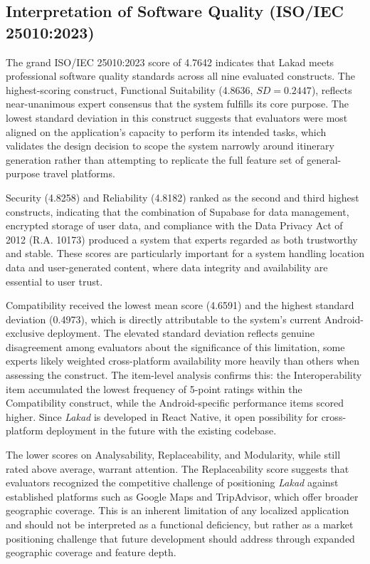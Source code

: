 \subsection{Interpretation of Software Quality (ISO/IEC 25010:2023)}
 
The grand ISO/IEC 25010:2023 score of 4.7642 indicates that Lakad meets
professional software quality standards across all nine evaluated
constructs. The highest-scoring construct, Functional Suitability
(4.8636, $SD = 0.2447$), reflects near-unanimous expert consensus that
the system fulfills its core purpose. The lowest standard
deviation in this construct suggests that evaluators were most aligned
on the application’s capacity to perform its intended tasks, which
validates the design decision to scope the system narrowly around
itinerary generation rather than attempting to replicate the full
feature set of general-purpose travel platforms.
 
Security (4.8258) and Reliability (4.8182) ranked as the second and
third highest constructs, indicating that the combination of Supabase
for data management, encrypted storage of user data, and compliance
with the Data Privacy Act of 2012 (R.A. 10173) produced a system
that experts regarded as both trustworthy and stable. These scores
are particularly important for a system handling location data and
user-generated content, where data integrity and availability are
essential to user trust.
 
Compatibility received the lowest mean score (4.6591) and the highest
standard deviation (0.4973), which is directly attributable to the
system’s current Android-exclusive deployment. The elevated standard
deviation reflects genuine disagreement among evaluators about the
significance of this limitation, some experts likely weighted
cross-platform availability more heavily than others when assessing
the construct. The item-level analysis confirms this: the
Interoperability item accumulated the lowest frequency of 5-point
ratings within the Compatibility construct, while the Android-specific
performance items scored higher. Since \textit{Lakad} is developed in React Native, it open possibility for cross-platform deployment in the future with the existing codebase.
 
The lower scores on Analysability, Replaceability, and Modularity,
while still rated above average, warrant attention. The Replaceability
score suggests that evaluators recognized the competitive challenge
of positioning \textit{Lakad} against established platforms such as Google Maps
and TripAdvisor, which offer broader geographic coverage. This is
an inherent limitation of any localized application and should not
be interpreted as a functional deficiency, but rather as a market
positioning challenge that future development should address through
expanded geographic coverage and feature depth.
 
